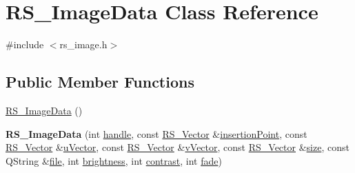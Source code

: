 \hypertarget{classRS__ImageData}{\section{R\-S\-\_\-\-Image\-Data Class Reference}
\label{classRS__ImageData}
}


{\ttfamily \#include $<$rs\-\_\-image.\-h$>$}

\subsection*{Public Member Functions}
\begin{DoxyCompactItemize}
\item 
\hyperlink{classRS__ImageData_a99374a4e112c819ca5917c4ad8d097f3}{R\-S\-\_\-\-Image\-Data} ()
\item 
\hypertarget{classRS__ImageData_abb3d823aecd822a5ce237b229c07949e}{{\bfseries R\-S\-\_\-\-Image\-Data} (int \hyperlink{classRS__ImageData_a28c803b859c0de2d6f34ba28f54883aa}{handle}, const \hyperlink{classRS__Vector}{R\-S\-\_\-\-Vector} \&\hyperlink{classRS__ImageData_aaf6f77de66abe74d9a22323721a01b43}{insertion\-Point}, const \hyperlink{classRS__Vector}{R\-S\-\_\-\-Vector} \&\hyperlink{classRS__ImageData_a1313726d8b7c341fdce24d3173504845}{u\-Vector}, const \hyperlink{classRS__Vector}{R\-S\-\_\-\-Vector} \&\hyperlink{classRS__ImageData_addc13777db6fc456f6d60dd4deb170db}{v\-Vector}, const \hyperlink{classRS__Vector}{R\-S\-\_\-\-Vector} \&\hyperlink{classRS__ImageData_a61be922fb59669f261444420eb95838e}{size}, const Q\-String \&\hyperlink{classRS__ImageData_ab1e8cbf7bddf033267c25ce18b90222b}{file}, int \hyperlink{classRS__ImageData_a6aeb92c7c3cc0307bbab71df1aca35cd}{brightness}, int \hyperlink{classRS__ImageData_ac89ef574dc340a20662bbb8829eb0ba3}{contrast}, int \hyperlink{classRS__ImageData_afa168ba63f68678c24f14bcb10ef5b51}{fade})}\label{classRS__ImageData_abb3d823aecd822a5ce237b229c07949e}

\end{DoxyCompactItemize}
